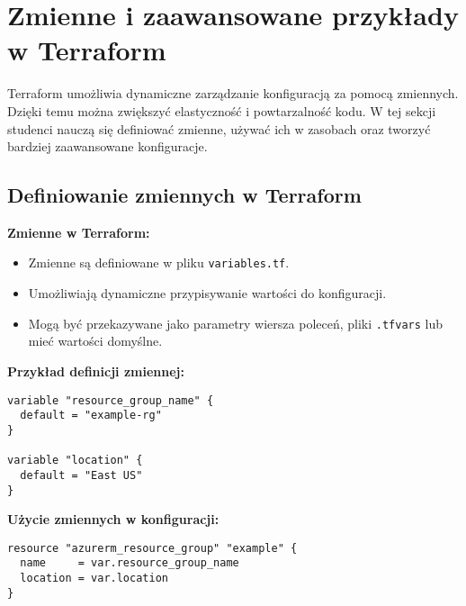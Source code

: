 \documentclass{article}
\begin{document}
\section{Zmienne i zaawansowane przykłady w Terraform}
Terraform umożliwia dynamiczne zarządzanie konfiguracją za pomocą zmiennych. Dzięki temu można zwiększyć elastyczność i powtarzalność kodu. W tej sekcji studenci nauczą się definiować zmienne, używać ich w zasobach oraz tworzyć bardziej zaawansowane konfiguracje.

\subsection{Definiowanie zmiennych w Terraform}
\textbf{Zmienne w Terraform:}
\begin{itemize}
    \item Zmienne są definiowane w pliku \texttt{variables.tf}.
    \item Umożliwiają dynamiczne przypisywanie wartości do konfiguracji.
    \item Mogą być przekazywane jako parametry wiersza poleceń, pliki \texttt{.tfvars} lub mieć wartości domyślne.
\end{itemize}

\textbf{Przykład definicji zmiennej:}
\begin{lstlisting}
variable "resource_group_name" {
  default = "example-rg"
}

variable "location" {
  default = "East US"
}
\end{lstlisting}

\textbf{Użycie zmiennych w konfiguracji:}
\begin{lstlisting}
resource "azurerm_resource_group" "example" {
  name     = var.resource_group_name
  location = var.location
}
\end{lstlisting}
\end{document}
